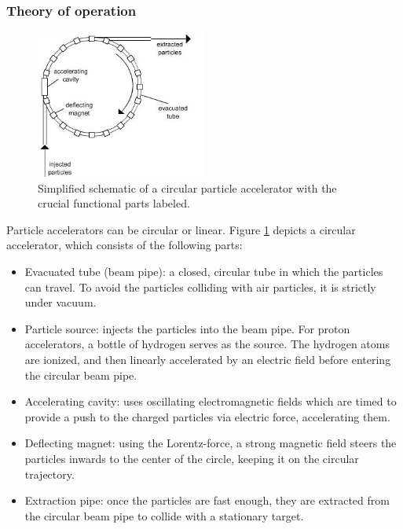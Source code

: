 \documentclass[12pt]{article}
\begin{document}
\subsubsection{Theory of operation}\label{sec_part_accel_theory}

\begin{figure}[H]
	\begin{center}
		\includegraphics[width=0.5\textwidth]{particle_accelerator_schematic}
	\end{center}
	\caption{Simplified schematic of a circular particle accelerator with the crucial functional parts labeled.}
	\label{fig_part_accel_schematic}
\end{figure}

Particle accelerators can be circular or linear. Figure \ref{fig_part_accel_schematic} depicts a circular accelerator, which consists of the following parts:
\begin{itemize}
	\item Evacuated tube (beam pipe): a closed, circular tube in which the particles can travel. To avoid the particles colliding with air particles, it is strictly under vacuum.
	\item Particle source: injects the particles into the beam pipe. For proton accelerators, a bottle of hydrogen serves as the source. The hydrogen atoms are ionized, and then linearly accelerated by an electric field before entering the circular beam pipe.
	\item Accelerating cavity: uses oscillating electromagnetic fields which are timed to provide a push to the charged particles via electric force, accelerating them.
	\item Deflecting magnet: using the Lorentz-force, a strong magnetic field steers the particles inwards to the center of the circle, keeping it on the circular trajectory.
	\item Extraction pipe: once the particles are fast enough, they are extracted from the circular beam pipe to collide with a stationary target.
\end{itemize}
\end{document}
